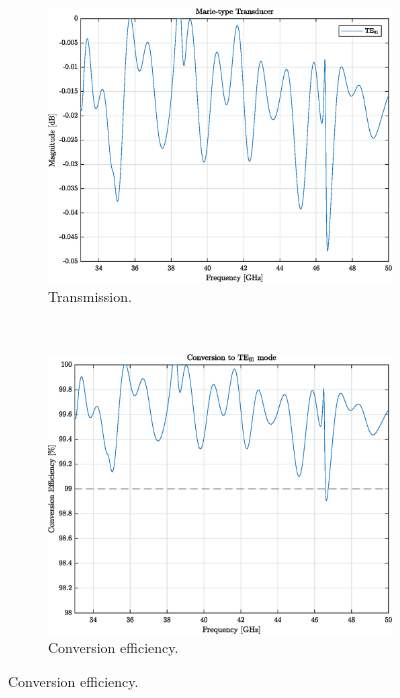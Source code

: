 \documentclass[english,twoside]{article}
\begin{document}
    \begin{figure}
			\centering			
			\begin{subfigure}[b]{0.48\textwidth}
				\includegraphics[width=\textwidth]{figures/marie_cst_transmission}
				\caption{Transmission.}
			\end{subfigure}
			~
			\begin{subfigure}[b]{0.48\textwidth}
				\includegraphics[width=\textwidth]{figures/marie_cst_eff}
				\caption{Conversion efficiency.}
			\end{subfigure}
		
		    \vspace{10pt}
		    

\end{figure}
\end{document}
